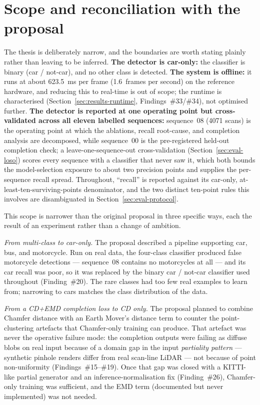\section{Scope and reconciliation with the proposal}
\label{sec:intro-scope}

The thesis is deliberately narrow, and the boundaries are worth stating plainly
rather than leaving to be inferred. \textbf{The detector is car-only:} the
classifier is binary (car / not-car), and no other class is detected. \textbf{The
system is offline:} it runs at about \SI{623.5}{\milli\second} per frame
(\num{1.6}~frames per second) on the reference hardware, and reducing this to
real-time is out of scope; the runtime is characterised (Section~\ref{sec:results-runtime},
Findings~\#33/\#34), not optimised further. \textbf{The detector is reported at one
operating point but cross-validated across all eleven labelled sequences:}
sequence~08 (\num{4071} scans) is the operating point at which the ablations,
recall root-cause, and completion analysis are decomposed, while sequence~00 is the
pre-registered held-out completion check; a leave-one-sequence-out cross-validation
(Section~\ref{sec:eval-loso}) scores every sequence with a classifier that never saw
it, which both bounds the model-selection exposure to about two precision points and
supplies the per-sequence recall spread.
Throughout, ``recall'' is reported against its car-only, at-least-ten-surviving-points
denominator, and the two distinct ten-point rules this involves are disambiguated
in Section~\ref{sec:eval-protocol}.

This scope is narrower than the original proposal in three specific ways, each the
result of an experiment rather than a change of ambition.

\emph{From multi-class to car-only.} The proposal described a pipeline supporting
car, bus, and motorcycle. Run on real data, the four-class classifier produced false
motorcycle detections --- sequence~08 contains no motorcycles at all --- and its car
recall was poor, so it was replaced by the binary car / not-car classifier used
throughout (Finding~\#20). The rare classes had too few real examples to learn from;
narrowing to cars matches the class distribution of the data.

\emph{From a CD+EMD completion loss to CD only.} The proposal planned to combine
Chamfer distance with an Earth Mover's distance term to counter the point-clustering
artefacts that Chamfer-only training can produce. That artefact was never the
operative failure mode: the completion outputs were failing as diffuse blobs on real
input because of a domain gap in the input \emph{partiality pattern} --- synthetic
pinhole renders differ from real scan-line LiDAR --- not because of point
non-uniformity (Findings~\#15--\#19). Once that gap was closed with a KITTI-like
partial generator and an inference-normalisation fix (Finding~\#26), Chamfer-only
training was sufficient, and the EMD term (documented but never implemented) was not
needed.

